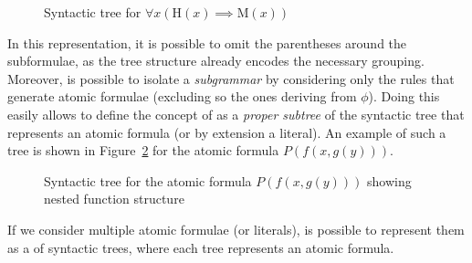 \begin{figure}[H]
    \centering
    \caption{Syntactic tree for \(\forall x (\text{H}(x) \implies \text{M}(x))\)}\label{fig:syntactic_tree}
\end{figure}

In this representation, it is possible to omit the parentheses around the subformulae, as the tree structure already encodes the necessary grouping.
Moreover, is possible to isolate a \emph{subgrammar} by considering only the rules that generate atomic formulae (excluding so the ones deriving from \(\phi\)). Doing this easily allows to define the concept of  as a \emph{proper subtree} of the syntactic tree that represents an atomic formula (or by extension a literal).
An example of such a tree is shown in Figure~\ref{fig:subterm_tree} for the atomic formula \(P(f(x, g(y)))\).
\begin{figure}[H]
    \centering
    \caption{Syntactic tree for the atomic formula \(P(f(x, g(y)))\) showing nested function structure}\label{fig:subterm_tree}
\end{figure}

If we consider multiple atomic formulae (or literals), is possible to represent them as a  of syntactic trees, where each tree represents an atomic formula.

